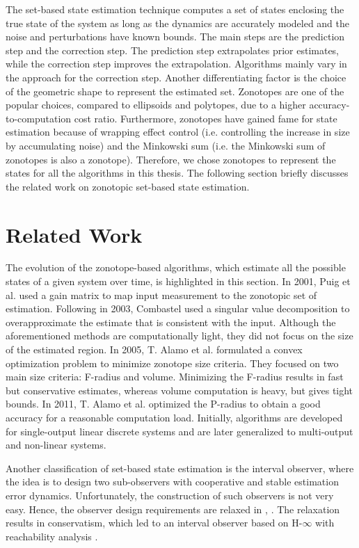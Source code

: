 The set-based state estimation technique computes a set of states enclosing the true state of the system as long as the dynamics are accurately modeled and the noise and perturbations have known bounds. The main steps are the prediction step and the correction step. The prediction step extrapolates prior estimates, while the correction step improves the extrapolation. Algorithms mainly vary in the approach for the correction step. Another differentiating factor is the choice of the geometric shape to represent the estimated set. Zonotopes are one of the popular choices, compared to ellipsoids and polytopes, due to a higher accuracy-to-computation cost ratio. Furthermore, zonotopes have gained fame for state estimation because of wrapping effect control \cite{Kuhn1998} (i.e. controlling the increase in size by accumulating noise) and the Minkowski sum (i.e. the Minkowski sum of zonotopes is also a zonotope). Therefore, we chose zonotopes to represent the states for all the algorithms in this thesis. The following section briefly discusses the related work on zonotopic set-based state estimation.


\section{Related Work}
The evolution of the zonotope-based algorithms, which estimate all the possible states of a given system over time, is highlighted in this section. In 2001, Puig et al. \cite{Puig2001} used a gain matrix to map input measurement to the zonotopic set of estimation. Following in 2003, Combastel \cite{Combastel2003} used a singular value decomposition to overapproximate the estimate that is consistent with the input. Although the aforementioned methods are computationally light, they did not focus on the size of the estimated region. In 2005, T. Alamo et al. \cite{Alamo2005} formulated a convex optimization problem to minimize zonotope size criteria. They focused on two main size criteria: F-radius and volume. Minimizing the F-radius results in fast but conservative estimates, whereas volume computation is heavy, but gives tight bounds. In 2011, T. Alamo et al. \cite{Le2012} optimized the P-radius to obtain a good accuracy for a reasonable computation load. Initially, algorithms are developed for single-output linear discrete systems and are later generalized to multi-output and non-linear systems.  

Another classification of set-based state estimation is the interval observer, where the idea is to design two sub-observers with cooperative and stable estimation error dynamics. Unfortunately, the construction of such observers is not very easy. Hence, the observer design requirements are relaxed in  \cite{Mazenc2011}, \cite{Raissi2012}. The relaxation results in conservatism, which led to an interval observer based on H-$\infty$ with reachability analysis \cite{Tang2019}.

